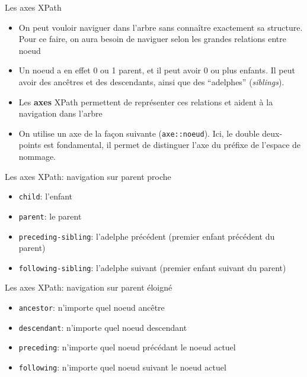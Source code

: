 \documentclass[11pt,aspectratio=169]{beamer}
\begin{document}
\begin{frame}{Les axes XPath}
\begin{itemize}
\item On peut vouloir naviguer dans l'arbre sans connaître exactement sa structure. Pour ce faire, on aura besoin de naviguer selon les grandes relations entre noeud
\item Un noeud a en effet 0 ou 1 parent, et il peut avoir 0 ou plus enfants. Il peut avoir des ancêtres et des descendants, ainsi que des \enquote{adelphes} (\textit{siblings}).
\item Les \textbf{axes} XPath permettent de représenter ces relations et aident à la navigation dans l'arbre
\item On utilise un axe de la façon suivante (\texttt{axe::noeud}). Ici, le double deux-points est fondamental, il permet de distinguer l'axe du préfixe de l'espace de nommage.
\end{itemize}
\end{frame}

\begin{frame}{Les axes XPath: navigation sur parent proche}
\begin{itemize}
\item \texttt{child}: l'enfant
\item \texttt{parent}: le parent
\item \texttt{preceding-sibling}: l'adelphe précédent (premier enfant précédent du parent)
\item \texttt{following-sibling}: l'adelphe suivant (premier enfant suivant du parent)
\end{itemize}
\end{frame}

\begin{frame}{Les axes XPath: navigation sur parent éloigné}
\begin{itemize}
\item \texttt{ancestor}: n'importe quel noeud ancêtre
\item \texttt{descendant}: n'importe quel noeud descendant
\item \texttt{preceding}: n'importe quel noeud précédant le noeud actuel
\item \texttt{following}: n'importe quel noeud suivant le noeud actuel
\end{itemize}
\end{frame}
\end{document}
